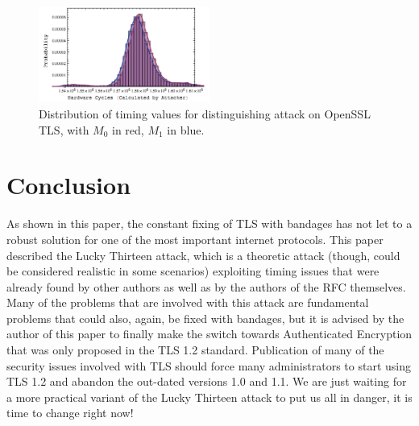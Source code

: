 \documentclass[10pt,conference,a4paper]{IEEEtran}
\begin{document}
\begin{figure}[h]
	\centering
	\includegraphics[width=0.5\textwidth]{afterfix.png}
	\caption{Distribution of timing values for distinguishing attack on OpenSSL TLS, with $M_0$ in red, $M_1$ in blue.~\cite{alfardan2013lucky}}
	\label{fig:afterfix}
\end{figure}



\section{Conclusion}
\label{sec:conclusion}
As shown in this paper, the constant fixing of TLS with bandages has not let to a robust solution for one of the most important internet protocols. This paper described the Lucky Thirteen attack, which is a theoretic attack (though, could be considered realistic in some scenarios) exploiting timing issues that were already found by other authors as well as by the authors of the RFC themselves. Many of the problems that are involved with this attack are fundamental problems that could also, again, be fixed with bandages, but it is advised by the author of this paper to finally make the switch towards Authenticated Encryption that was only proposed in the TLS 1.2 standard. Publication of many of the security issues involved with TLS should force many administrators to start using TLS 1.2 and abandon the out-dated versions 1.0 and 1.1. We are just waiting for a more practical variant of the Lucky Thirteen attack to put us all in danger, it is time to change right now!


%

\end{document}
